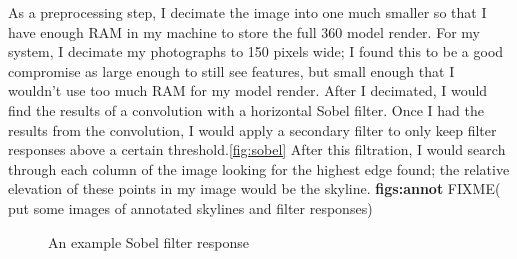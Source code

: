 \documentclass{acm_proc_article-sp}
\begin{document}
As a preprocessing step, I decimate the image into one much smaller so that I have enough RAM in my machine to store the full 360 model render.  For my system, I decimate my photographs to 150 pixels wide; I found this to be a good compromise as large enough to still see features, but small enough that I wouldn’t use too much RAM for my model render. After I decimated, I would find the results of a convolution with a horizontal Sobel filter. Once I had the results from the convolution, I would apply a secondary filter to only keep filter responses above a certain threshold.\ref{fig:sobel}  After this filtration, I would search through each column of the image looking for the highest edge found; the relative elevation of these points in my image would be the skyline. \textbf{figs:annot} FIXME( put some images of annotated skylines and filter responses)
\begin{figure}
	\centering
	\caption{An example Sobel filter response}
\end{figure}
\end{document}

